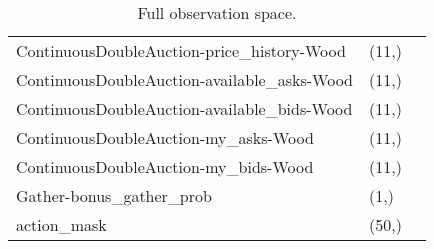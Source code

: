 \begin{table}[]
\begin{tabular}{lll}
    ContinuousDoubleAuction-price\_history-Wood   & (11,)       &                             \\ 
    ContinuousDoubleAuction-available\_asks-Wood  & (11,)       &                             \\ 
    ContinuousDoubleAuction-available\_bids-Wood  & (11,)       &                             \\ 
    ContinuousDoubleAuction-my\_asks-Wood         & (11,)       &                             \\ 
    ContinuousDoubleAuction-my\_bids-Wood         & (11,)       &                             \\ 
    Gather-bonus\_gather\_prob                    & (1,)        &                             \\ 
    action\_mask                                  & (50,)       &                             \\ \hline
    \end{tabular}
    \caption{\label{tab:full_obs} Full observation space.}
\end{table}